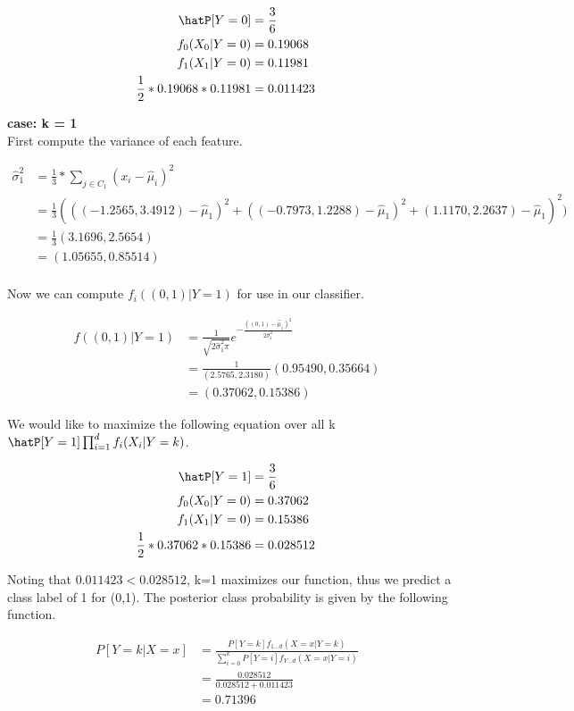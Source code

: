 \documentclass{jhwhw}
\newcommand{\Hat}[1]{\expandafter\hat#1}
\begin{document}
    \begin{align*}
	\Hat{P}[Y=0] &= \frac{3}{6} &\\
	f_0(X_0|Y=0) &= 0.19068 &\\
	f_1(X_1|Y=0) &= 0.11981 &\\
	\frac{1}{2}*0.19068*0.11981 &= 0.011423
    \end{align*}

    \bigbreak
    \textbf{case: k = 1} \\

    First compute the variance of each feature.

    \begin{align*}
	\Hat{\sigma}_1^2 &= \frac{1}{3} * \sum_{j\in C_1} (x_i - \Hat{\mu}_i)^2 &\\
	&= \frac{1}{3}(((-1.2565, 3.4912) - \Hat{\mu}_1) ^2 
	    + ((-0.7973, 1.2288) - \Hat{\mu}_1)^2 + (1.1170, 2.2637) - \Hat{\mu}_1)^2) &\\
	&= \frac{1}{3}(3.1696, 2.5654) &\\
	&= (1.05655, 0.85514) &\\
    \end{align*}

    Now we can compute $f_i((0,1)|Y=1)$ for use in our classifier.

    \begin{align*}
	f((0,1)|Y=1) &= \frac{1}{\sqrt{2\Hat{\sigma}_1^2\pi}}
	    e^{-\frac{((0,1)-\Hat{\mu}_1)^2}{2\Hat{\sigma}_1^2}} &\\
	&= \frac{1}{(2.5765, 2.3180)} (0.95490, 0.35664) &\\
	&= (0.37062, 0.15386)
    \end{align*}

    We would like to maximize the following equation over all k
    $\Hat{P}[Y=1]\prod_{i=1}^{d}f_i(X_i|Y=k)$.

    \begin{align*}
	\Hat{P}[Y=1] &= \frac{3}{6} &\\
	f_0(X_0|Y=0) &= 0.37062 &\\
	f_1(X_1|Y=0) &= 0.15386 &\\
	\frac{1}{2}*0.37062*0.15386 &= 0.028512
    \end{align*}

    Noting that $0.011423 < 0.028512$, k=1 maximizes our function, thus we 
    predict a class label of 1 for (0,1).
    The posterior class probability is given by the following function.

    \begin{align*}
	P[Y=k|X=x] &= \frac{P[Y=k]f_{1\ldots d}(X=x|Y=k)}
	    {\sum_{i=0}^{k} P[Y=i]f_{Y\ldots d}(X=x|Y=i)} &\\
	&= \frac {0.028512} {0.028512 + 0.011423} &\\
	&= 0.71396
    \end{align*}
\end{document}
